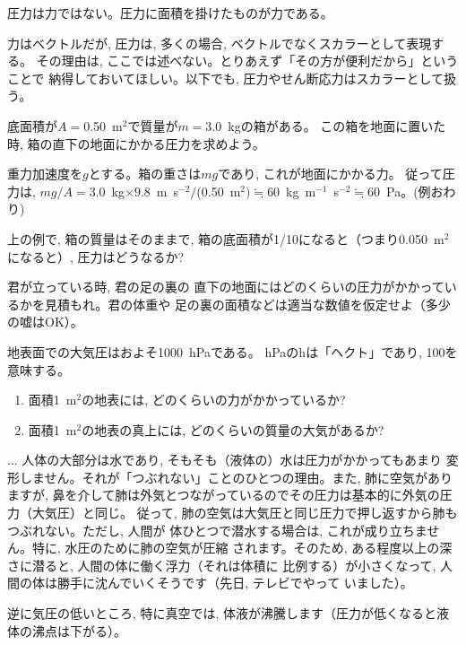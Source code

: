 圧力は力ではない。圧力に面積を掛けたものが力である。

力はベクトルだが, 圧力は, 多くの場合, ベクトルでなくスカラーとして表現する。
その理由は, ここでは述べない。とりあえず「その方が便利だから」ということで
納得しておいてほしい。以下でも, 圧力やせん断応力はスカラーとして扱う。

\begin{exmpl} 底面積が$A=$0.50~m$^2$で質量が$m=$3.0~kgの箱がある。
この箱を地面に置いた時, 箱の直下の地面にかかる圧力を求めよう。

重力加速度を$g$とする。箱の重さは$mg$であり, これが地面にかかる力。
従って圧力は, $mg/A=3.0$~kg$\times 9.8$~m~s$^{-2}/$(0.50~m$^2)\fallingdotseq 60$~kg~m$^{-1}$~s$^{-2}\fallingdotseq 60$~Pa。(例おわり)
\end{exmpl}

\begin{q} 上の例で, 箱の質量はそのままで, 
箱の底面積が1/10になると（つまり0.050~m$^2$になると）, 圧力はどうなるか?
\end{q}

\begin{q}\label{q:pressure_shoes} 君が立っている時, 君の足の裏の
直下の地面にはどのくらいの圧力がかかっているかを見積もれ。君の体重や
足の裏の面積などは適当な数値を仮定せよ（多少の嘘はOK）。
\end{q}

\begin{q}\label{q:pressure} 地表面での大気圧はおよそ1000~hPaである。
hPaのhは「ヘクト」であり, 100を意味する。
\begin{enumerate}
\item 面積1~m$^2$の地表には, どのくらいの力がかかっているか?
\item 面積1~m$^2$の地表の真上には, どのくらいの質量の大気があるか?
\end{enumerate}
\end{q}

\begin{faq}{\small{}
... 人体の大部分は水であり, そもそも（液体の）水は圧力がかかってもあまり
変形しません。それが「つぶれない」ことのひとつの理由。また, 肺に空気がありますが, 
鼻を介して肺は外気とつながっているのでその圧力は基本的に外気の圧力（大気圧）と同じ。
従って, 肺の空気は大気圧と同じ圧力で押し返すから肺もつぶれない。ただし, 人間が
体ひとつで潜水する場合は, これが成り立ちません。特に, 水圧のために肺の空気が圧縮
されます。そのため, ある程度以上の深さに潜ると, 人間の体に働く浮力（それは体積に
比例する）が小さくなって, 人間の体は勝手に沈んでいくそうです（先日, テレビでやって
いました）。

逆に気圧の低いところ, 特に真空では, 体液が沸騰します（圧力が低くなると液体の沸点は下がる）。}\end{faq}
\mv


